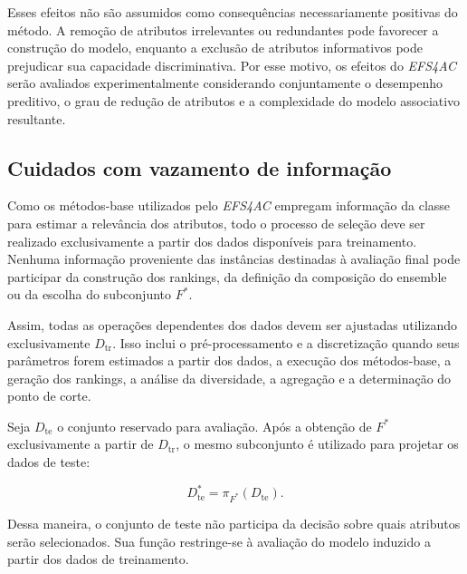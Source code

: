 Esses efeitos não são assumidos como consequências necessariamente positivas
do método. A remoção de atributos irrelevantes ou redundantes pode favorecer
a construção do modelo, enquanto a exclusão de atributos informativos pode
prejudicar sua capacidade discriminativa. Por esse motivo, os efeitos do
\textit{EFS4AC} serão avaliados experimentalmente considerando conjuntamente
o desempenho preditivo, o grau de redução de atributos e a complexidade do
modelo associativo resultante.


\subsection{Cuidados com vazamento de informação}
\label{subsec:ac-efs-vazamento}

Como os métodos-base utilizados pelo \textit{EFS4AC} empregam informação da
classe para estimar a relevância dos atributos, todo o processo de seleção deve
ser realizado exclusivamente a partir dos dados disponíveis para treinamento.
Nenhuma informação proveniente das instâncias destinadas à avaliação final
pode participar da construção dos rankings, da definição da composição do
ensemble ou da escolha do subconjunto $F^{*}$.

Assim, todas as operações dependentes dos dados devem ser ajustadas utilizando
exclusivamente $D_{\mathrm{tr}}$. Isso inclui o pré-processamento e a
discretização quando seus parâmetros forem estimados a partir dos dados, a
execução dos métodos-base, a geração dos rankings, a análise da diversidade,
a agregação e a determinação do ponto de corte.

Seja $D_{\mathrm{te}}$ o conjunto reservado para avaliação. Após a obtenção de
$F^{*}$ exclusivamente a partir de $D_{\mathrm{tr}}$, o mesmo subconjunto é
utilizado para projetar os dados de teste:

\begin{equation}
    D_{\mathrm{te}}^{*}
    =
    \pi_{F^{*}}
    \left(
        D_{\mathrm{te}}
    \right).
    \label{eq:projecao-teste-ca-ac-efs}
\end{equation}

Dessa maneira, o conjunto de teste não participa da decisão sobre quais
atributos serão selecionados. Sua função restringe-se à avaliação do modelo
induzido a partir dos dados de treinamento.


